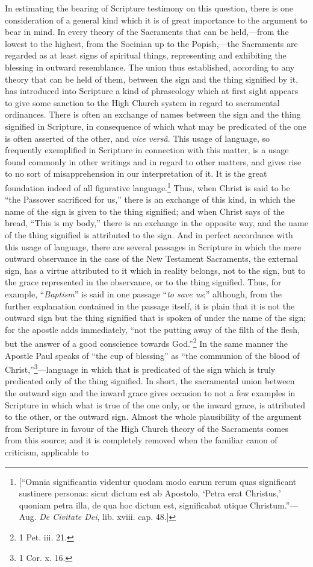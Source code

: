 \documentclass[english,]{book}
\begin{document}
In estimating the bearing of Scripture testimony on this question, there is one consideration of a general kind which it is of great importance to the argument to bear in mind. In every theory of the Sacraments that can be held,---from the lowest to the highest, from the Socinian up to the Popish,---the Sacraments are regarded as at least signs of spiritual things, representing and exhibiting the blessing in outward resemblance. The union thus established, according to any theory that can be held of them, between the sign and the thing signified by it, has introduced into Scripture a kind of phraseology which at first sight appears to give some sanction to the High Church system in regard to sacramental ordinances. There is often an exchange of names between the sign and the thing signified in Scripture, in consequence of which what may be predicated of the one is often asserted of the other, and \emph{vice versâ}. This usage of language, so frequently exemplified in Scripture in connection with this matter, is a usage found commonly in other writings and in regard to other matters, and gives rise to no sort of misapprehension in our interpretation of it. It is the great foundation indeed of all figurative language.\footnote{{[}``Omnia significantia videntur quodam modo earum rerum quas significant sustinere personas: sicut dictum est ab Apostolo, `Petra erat Christus,' quoniam petra illa, de qua hoc dictum est, significabat utique Christum.''---Aug. \emph{De Civitate Dei}, lib. xviii. cap. 48.{]}} Thus, when Christ is said to be ``the Passover sacrificed for us,'' there is an exchange of this kind, in which the name of the sign is given to the thing signified; and when Christ says of the bread, ``This is my body,'' there is an exchange in the opposite way, and the name of the thing signified is attributed to the sign. And in perfect accordance with this usage of language, there are several passages in Scripture in which the mere outward observance in the case of the New Testament Sacraments, the external sign, has a virtue attributed to it which in reality belongs, not to the sign, but to the grace represented in the observance, or to the thing signified. Thus, for example, ``\emph{Baptism}'' is said in one passage ``\emph{to save us};'' although, from the further explanation contained in the passage itself, it is plain that it is not the outward sign but the thing signified that is spoken of under the name of the sign; for the apostle adds immediately, ``not the putting away of the filth of the flesh, but the answer of a good conscience towards God.''\footnote{1 Pet. iii. 21.} In the same manner the Apostle Paul speaks of ``the cup of blessing'' as ``the communion of the blood of Christ,''\footnote{1 Cor. x. 16.}---language in which that is predicated of the sign which is truly predicated only of the thing signified. In short, the sacramental union between the outward sign and the inward grace gives occasion to not a few examples in Scripture in which what is true of the one only, or the inward grace, is attributed to the other, or the outward sign. Almost the whole plausibility of the argument from Scripture in favour of the High Church theory of the Sacraments comes from this source; and it is completely removed when the familiar canon of criticism, applicable to 
\end{document}
